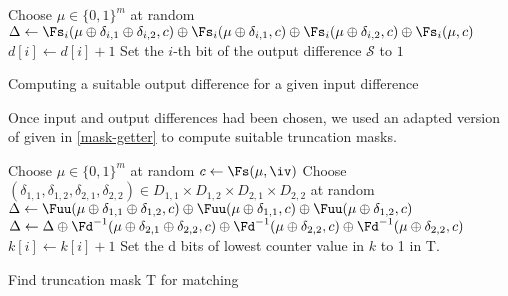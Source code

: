   \begin{algorithm}[htb]
        \LinesNumbered
    {
      Choose $\mu \in \{0,1\}^m$ at random\;
      $\Delta \leftarrow \Fs_i (\mu \oplus \delta_{i,1} \oplus \delta_{i,2} , c) \oplus \Fs_i (\mu \oplus \delta_{i,1} , c) \oplus
      \Fs_i(\mu \oplus \delta_{i,2},c) \oplus \Fs_i (\mu,c)$\;
      {
        {
          $d[i] \leftarrow d[i] + 1$\;
        }
      }
    }
    {
      {
        Set the $i$-th bit of the output difference $\mathcal{S}$ to $1$\;
      }
    }
    \caption{\label{difference-getter}Computing a suitable output difference for a given input difference}
  \end{algorithm}

  Once input and output differences had been chosen, we used an adapted version of \cite[Algorithm~2]{DBLP:conf/crypto/KnellwolfK12} given in
  \autoref{mask-getter} to compute suitable truncation masks. 

  \begin{algorithm}[ht]
        \LinesNumbered

    {
      Choose $\mu \in \{0,1\}^m$ at random \;
      $c \leftarrow \Fs(\mu, \iv)$\;
      Choose $(\delta_{1,1},\delta_{1,2},\delta_{2,1},\delta_{2,2}) \in D_{1,1} \times D_{1,2} \times D_{2,1} \times D_{2,2} $ at random\; 
      $\Delta \leftarrow 
      \Fuu (\mu \oplus \delta_{1,1} \oplus \delta_{1,2} , c) \oplus 
      \Fuu (\mu \oplus \delta_{1,1} , c) \oplus 
      \Fuu(\mu \oplus \delta_{1,2},c)$\;
      $\Delta \leftarrow \Delta \oplus
      \Fd^{-1} (\mu \oplus \delta_{2,1} \oplus \delta_{2,2}, c) \oplus 
      \Fd^{-1}(\mu \oplus \delta_{2,2} , c) \oplus 
      \Fd^{-1} (\mu \oplus \delta_{2,2} , c) $\;
      {
        {
          $k[i] \leftarrow k[i] + 1$\;
        }
      }
    }
    Set the d bits of lowest counter value in $k$ to 1 in T.
    \caption{\label{mask-getter}Find truncation mask T for matching}
  \end{algorithm}

